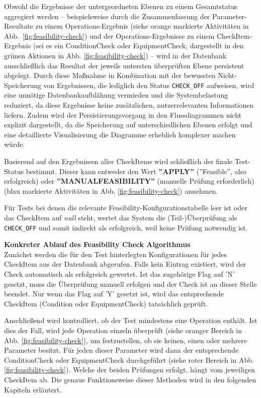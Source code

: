 Obwohl die Ergebnisse der untergeordneten Ebenen zu einem Gesamtstatus aggregiert werden – beispielsweise durch die Zusammenfassung der Parameter-Resultate zu einem Operations-Ergebnis (siehe orange markierte Aktivitäten in Abb. \ref{fig:feasibility-check}) und der Operations-Ergebnisse zu einem CheckItem-Ergebnis (sei es ein \gls{ConditionCheck} oder \gls{EquipmentCheck}, dargestellt in den grünen Aktionen in Abb. \ref{fig:feasibility-check}) – wird in der Datenbank ausschließlich das Resultat der jeweils untersten überprüften Ebene persistent abgelegt. Durch diese Maßnahme in Kombination mit der bewussten Nicht-Speicherung von Ergebnissen, die lediglich den Status \texttt{CHECK\_OFF} aufweisen, wird eine unnötige Datenbankaufblähung vermieden und die Systembelastung reduziert, da diese Ergebnisse keine zusätzlichen, nutzerrelevanten Informationen liefern. Zudem wird der Persistierungsvorgang in den Flussdiagrammen nicht explizit dargestellt, da die Speicherung auf unterschiedlichen Ebenen erfolgt und eine detaillierte Visualisierung die Diagramme erheblich komplexer machen würde.

Basierend auf den Ergebnissen aller CheckItems wird schließlich der finale Test-Status bestimmt. Dieser kann entweder den Wert \textbf{''APPLY''} (''Feasible'', also erfolgreich) oder \textbf{''MANUALFEASIBILITY''} (manuelle Prüfung erforderlich) (blau markierte Aktivitäten in Abb. \ref{fig:feasibility-check}) annehmen.

Für Tests bei denen die relevante Feasibility-Konfigurationstabelle leer ist oder das CheckItem auf \textit{null} steht, wertet das System die (Teil-)Überprüfung als \texttt{CHECK\_OFF} und somit indirekt als erfolgreich, weil keine Prüfung notwendig ist.

\textbf{Konkreter Ablauf des Feasibility Check Algorithmus} \\
Zunächst werden die für den Test hinterlegten Konfigurationen für jedes CheckItem aus der Datenbank abgerufen. Falls kein Eintrag existiert, wird der Check automatisch als erfolgreich gewertet. Ist das zugehörige Flag auf 'N' gesetzt, muss die Überprüfung manuell erfolgen und der Check ist an dieser Stelle beendet. Nur wenn das Flag auf 'Y' gesetzt ist, wird das entsprechende CheckItem (Condition oder \gls{EquipmentCheck}) tatsächlich geprüft.

Anschließend wird kontrolliert, ob der Test mindestens eine Operation enthält. Ist dies der Fall, wird jede Operation einzeln überprüft (siehe oranger Bereich in Abb. \ref{fig:feasibility-check}), um festzustellen, ob sie keinen, einen oder mehrere Parameter besitzt. Für jeden dieser Parameter wird dann der entsprechende \gls{ConditionCheck} oder \gls{EquipmentCheck} durchgeführt (siehe roter Bereich in Abb. \ref{fig:feasibility-check}). Welche der beiden Prüfungen erfolgt, hängt vom jeweiligen CheckItem ab. Die genaue Funktionsweise dieser Methoden wird in den folgenden Kapiteln erläutert.

